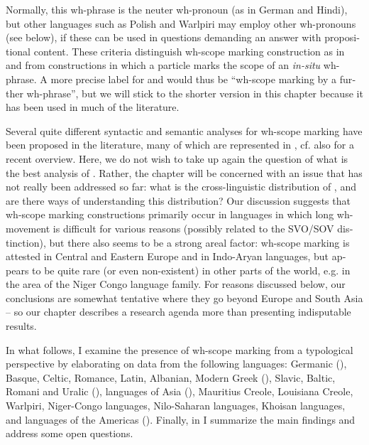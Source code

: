 \documentclass[output=paper,colorlinks,citecolor=brown]{langscibook}
\begin{document}
\begin{otherlanguage}{english}
{} Normally, this wh-phrase is the neuter wh-pronoun (as in German and Hindi), but other languages such as Polish and Warlpiri may employ other wh-pronouns (see below), if these can be used in questions demanding an answer with propositional content. These criteria distinguish wh-scope marking construction as in  and  from constructions in which a particle marks the scope of an \textit{in-situ} wh-phrase. A more precise label for  and  would thus be “wh-scope marking by a further wh-phrase”, but we will stick to the shorter version in this chapter because it has been used in much of the literature.

Several quite different syntactic and semantic analyses for wh-scope marking have been proposed in the literature, many of which are represented in \citet{Lutz-Muller-etal2000}, cf. also \citet{Fanselow2017a} for a recent overview. Here, we do not wish to take up again the question of what is the best analysis of . Rather, the chapter will be concerned with an issue that has not really been addressed so far: what is the cross-linguistic distribution of , and are there ways of understanding this distribution? Our discussion suggests that wh-scope marking constructions primarily occur in languages in which long wh-movement is difficult for various reasons (possibly related to the SVO/SOV distinction), but there also seems to be a strong areal factor: wh-scope marking is attested in Central and Eastern Europe and in Indo-Aryan languages, but appears to be quite rare (or even non-existent) in other parts of the world, e.g. in the area of the Niger Congo language family. For reasons discussed below, our conclusions are somewhat tentative where they go beyond Europe and South Asia -- so our chapter describes a research agenda more than presenting indisputable results.

In what follows, I examine the presence of wh-scope marking from a typological perspective by elaborating on data from the following languages: Germanic (), Basque, Celtic, Romance, Latin, Albanian, Modern Greek (), Slavic, Baltic, Romani and Uralic (), languages of Asia (), Mauritius Creole, Louisiana Creole, Warlpiri, Niger-Congo languages, Nilo-Saharan languages, Khoisan langua\-ges, and languages of the Americas (). Finally, in  I summarize the main findings and address some open questions.


\end{otherlanguage}
\end{document}
